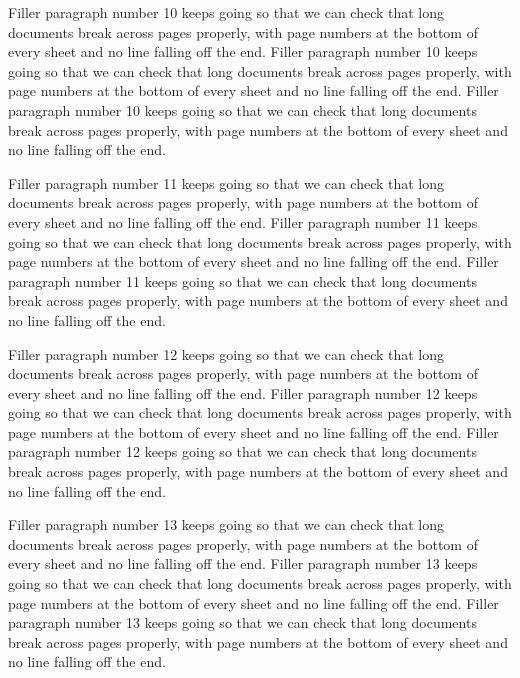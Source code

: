 \documentclass[11pt]{article}
\begin{document}
Filler paragraph number 10 keeps going so that we can check that long documents break across pages properly, with page numbers at the bottom of every sheet and no line falling off the end. Filler paragraph number 10 keeps going so that we can check that long documents break across pages properly, with page numbers at the bottom of every sheet and no line falling off the end. Filler paragraph number 10 keeps going so that we can check that long documents break across pages properly, with page numbers at the bottom of every sheet and no line falling off the end. 


Filler paragraph number 11 keeps going so that we can check that long documents break across pages properly, with page numbers at the bottom of every sheet and no line falling off the end. Filler paragraph number 11 keeps going so that we can check that long documents break across pages properly, with page numbers at the bottom of every sheet and no line falling off the end. Filler paragraph number 11 keeps going so that we can check that long documents break across pages properly, with page numbers at the bottom of every sheet and no line falling off the end. 


Filler paragraph number 12 keeps going so that we can check that long documents break across pages properly, with page numbers at the bottom of every sheet and no line falling off the end. Filler paragraph number 12 keeps going so that we can check that long documents break across pages properly, with page numbers at the bottom of every sheet and no line falling off the end. Filler paragraph number 12 keeps going so that we can check that long documents break across pages properly, with page numbers at the bottom of every sheet and no line falling off the end. 


Filler paragraph number 13 keeps going so that we can check that long documents break across pages properly, with page numbers at the bottom of every sheet and no line falling off the end. Filler paragraph number 13 keeps going so that we can check that long documents break across pages properly, with page numbers at the bottom of every sheet and no line falling off the end. Filler paragraph number 13 keeps going so that we can check that long documents break across pages properly, with page numbers at the bottom of every sheet and no line falling off the end. 
\end{document}
